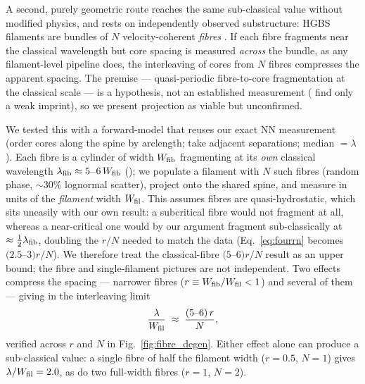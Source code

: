 \documentclass[usenatbib,twoside,twocolumn]{mnras}
\begin{document}
A second, purely geometric route reaches the same sub-classical value without modified physics, and rests on independently observed substructure: HGBS filaments are bundles of $N$ velocity-coherent \emph{fibres} \citep{Hacar2013,Hacar2018,Yang2024}. If each fibre fragments near the classical wavelength but core spacing is measured \emph{across} the bundle, as any filament-level pipeline does, the interleaving of cores from $N$ fibres compresses the apparent spacing. The premise --- quasi-periodic fibre-to-core fragmentation at the classical scale --- is a hypothesis, not an established measurement (\citealt{Yang2024} find only a weak imprint), so we present projection as viable but unconfirmed.

We tested this with a forward-model that reuses our exact NN measurement (order cores along the spine by arclength; take adjacent separations; median $=\lambda$). Each fibre is a cylinder of width $W_{\rm fib}$ fragmenting at its \emph{own} classical wavelength $\lambda_{\rm fib}\approx5$--$6\,W_{\rm fib}$ (\citealt{Fischera2012}); we populate a filament with $N$ such fibres (random phase, $\sim30\%$ lognormal scatter), project onto the shared spine, and measure in units of the \emph{filament} width $W_{\rm fil}$. This assumes fibres are quasi-hydrostatic, which sits uneasily with our own result: a subcritical fibre would not fragment at all, whereas a near-critical one would by our argument fragment sub-classically at $\approx\tfrac12\lambda_{\rm fib}$, doubling the $r/N$ needed to match the data (Eq.~\ref{eq:fourrn} becomes $(2.5$--$3)r/N$). We therefore treat the classical-fibre $(5$--$6)r/N$ result as an upper bound; the fibre and single-filament pictures are not independent. Two effects compress the spacing --- narrower fibres ($r\equiv W_{\rm fib}/W_{\rm fil}<1$) and several of them --- giving in the interleaving limit
\begin{equation}
\frac{\lambda}{W_{\rm fil}} \;\approx\; \frac{(5\text{--}6)\,r}{N},
\label{eq:fourrn}
\end{equation}
verified across $r$ and $N$ in Fig.~\ref{fig:fibre_degen}. Either effect alone can produce a sub-classical value: a single fibre of half the filament width ($r=0.5$, $N=1$) gives $\lambda/W_{\rm fil}=2.0$, as do two full-width fibres ($r=1$, $N=2$).
\end{document}
